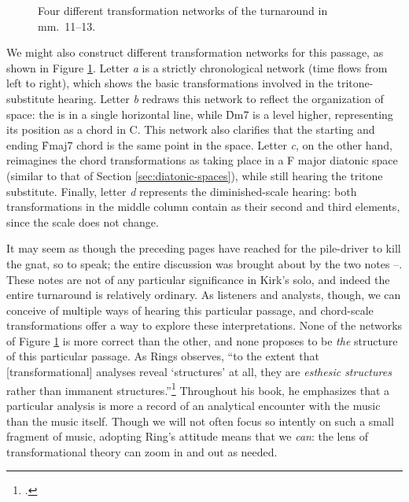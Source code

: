 \begin{figure}[p]
  \caption{Four different transformation networks of the turnaround in
    mm.~11--13.}
  \label{csa:turnaround-trans-networks}
\end{figure}

We might also construct different transformation networks for this passage, as
shown in Figure \ref{csa:turnaround-trans-networks}. Letter \emph{a}
is a strictly chronological network (time flows from left to right), which
shows the basic transformations involved in the tritone-substitute hearing.
Letter \emph{b} redraws this network to reflect the organization of \tf space:
the \tfo is in a single horizontal line, while \h{Dm7} is a level higher,
representing its position as a \ii chord in C. This network also clarifies that
the starting and ending \h{Fmaj7} chord is the same point in the space. Letter
\emph{c}, on the other hand, reimagines the chord transformations as taking
place in a F major diatonic space (similar to that of Section
\ref{sec:diatonic-spaces}), while still hearing the tritone substitute.
Finally, letter \emph{d} represents the diminished-scale hearing: both
transformations in the middle column contain  as their
second and third elements, since the scale does not change.

It may seem as though the preceding pages have reached for the pile-driver to
kill the gnat, so to speak; the entire discussion was brought about by the two
notes \Eflat--\Dflat. These notes are not of any particular
significance in Kirk's solo, and indeed the entire turnaround is relatively
ordinary. As listeners and analysts, though, we can conceive of multiple ways
of hearing this particular passage, and chord-scale transformations
offer a way to explore these interpretations. None of the networks of Figure
\ref{csa:turnaround-trans-networks} is more correct than the other, and none
proposes to be \emph{the} structure of this particular passage. As Rings
observes, ``to the extent that [transformational] analyses reveal `structures'
at all, they are \emph{esthesic structures} rather than immanent
structures.''\footcite[37, emphasis original]{rings:2011} Throughout his book,
he emphasizes that a particular analysis is more a record of an analytical
encounter with the music than the music itself. Though we will not often focus
so intently on such a small fragment of music, adopting Ring's attitude means
that we \emph{can}: the lens of transformational theory can zoom in and out as
needed.

